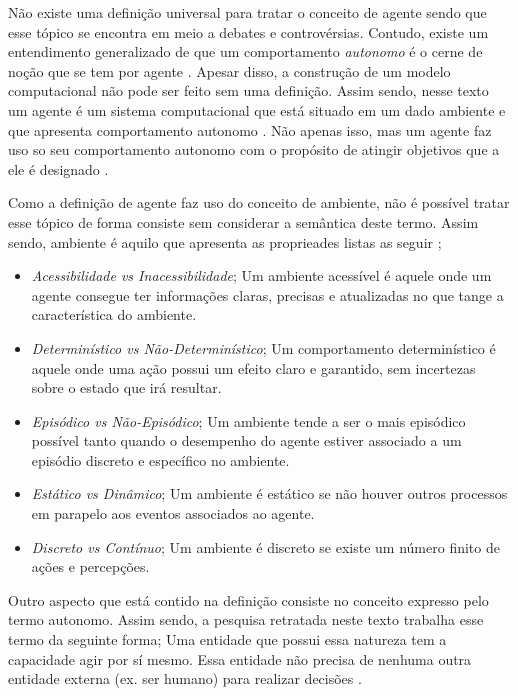 Não existe uma definição universal para tratar o conceito de agente sendo que esse tópico se encontra em meio a debates e controvérsias. Contudo, existe um entendimento generalizado de que 
um comportamento \textit{autonomo} é o cerne de noção que se tem por agente \cite{whatisagent}.  Apesar disso, a construção de um modelo computacional não pode ser feito sem uma definição. Assim sendo, nesse texto um agente é
 um sistema computacional que está situado em um dado ambiente e que apresenta comportamento autonomo \cite{whatisagent} \cite{whatisagent}. Não apenas isso, mas um agente faz uso
 so seu comportamento autonomo com o propósito de atingir objetivos que a ele é designado \cite{whatisagent} \cite{whatisagent}.


Como a definição de agente faz uso do conceito de ambiente, não é possível tratar esse tópico de forma consiste sem considerar a semântica deste termo. 
Assim sendo, ambiente é aquilo que apresenta as proprieades listas as seguir \cite{artificialinteligencemodermapproach} \cite{whatisagent}; 
\begin{itemize}
    \item \textit{Acessibilidade vs Inacessibilidade}; Um ambiente acessível é aquele onde um agente consegue ter informações claras, precisas e atualizadas no que tange a característica do ambiente.
    \item \textit{Determinístico vs Não-Determinístico}; Um comportamento determinístico é aquele onde uma ação possui um efeito claro e garantido, sem incertezas sobre o estado que irá resultar.
    \item \textit{Episódico vs Não-Episódico}; Um ambiente tende a ser o mais episódico possível tanto quando o desempenho do agente estiver associado a um episódio discreto e específico no ambiente.
    \item \textit{Estático vs Dinâmico}; Um ambiente é estático se não houver outros processos em parapelo aos eventos associados ao agente.
    \item \textit{Discreto vs Contínuo}; Um ambiente é discreto se existe um número finito de ações e percepções. 
\end{itemize}

Outro aspecto que está contido na definição consiste no conceito expresso pelo termo autonomo. Assim sendo, a pesquisa retratada neste texto trabalha esse termo
da seguinte forma; Uma entidade que possui essa natureza tem a capacidade agir por sí mesmo. Essa entidade não precisa de nenhuma outra entidade externa 
(ex. ser humano) para realizar decisões \cite{whatisagent} \cite{whatisagent}.

